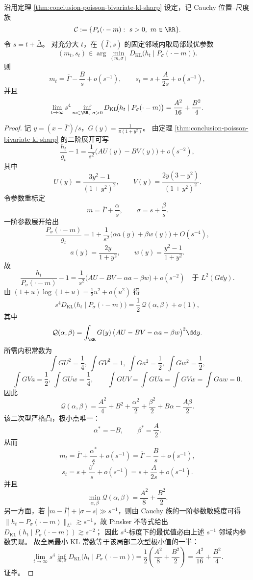 \begin{theorem}\label{thm:conclusion-poisson-bivariate-information-projection-halving}
沿用定理 \ref{thm:conclusion-poisson-bivariate-kl-sharp} 设定，记 Cauchy 位置--尺度族
\[
\mathcal C:=\{P_s(\cdot-m):\ s>0,\ m\in\RR\}.
\]
令 \(s=t+\bar\Delta\)。
对充分大 \(t\)，在 \((\bar\Gamma,s)\) 的固定邻域内取局部最优参数
\[
(m_t,s_t)\in\arg\min_{(m,\sigma)}D_{\mathrm{KL}}\!\bigl(h_t\mid P_\sigma(\cdot-m)\bigr).
\]
则
\[
m_t=\bar\Gamma-\frac{B}{s}+o(s^{-1}),
\qquad
s_t=s+\frac{A}{2s}+o(s^{-1}),
\]
并且
\[
\lim_{t\to\infty}s^4
\inf_{m\in\RR,\ \sigma>0}
D_{\mathrm{KL}}\!\bigl(h_t\mid P_\sigma(\cdot-m)\bigr)
=\frac{A^2}{16}+\frac{B^2}{4}.
\]
\end{theorem}
\begin{proof}
记 \(y=(x-\bar\Gamma)/s\)，\(G(y)=\frac{1}{\pi(1+y^2)}\)。
由定理 \ref{thm:conclusion-poisson-bivariate-kl-sharp} 的二阶展开可写
\[
\frac{h_t}{g_t}-1
=\frac{1}{s^2}\bigl(AU(y)-BV(y)\bigr)+o(s^{-2}),
\]
其中
\[
U(y)=\frac{3y^2-1}{(1+y^2)^2},\qquad
V(y)=\frac{2y(3-y^2)}{(1+y^2)^2}.
\]
令参数重标定
\[
m=\bar\Gamma+\frac{\alpha}{s},\qquad
\sigma=s+\frac{\beta}{s}.
\]
一阶参数展开给出
\[
\frac{P_\sigma(\cdot-m)}{g_t}
=1+\frac{1}{s^2}\bigl(\alpha a(y)+\beta w(y)\bigr)+O(s^{-4}),
\]
\[
a(y)=\frac{2y}{1+y^2},\qquad
w(y)=\frac{y^2-1}{1+y^2}.
\]
故
\[
\frac{h_t}{P_\sigma(\cdot-m)}-1
=\frac{1}{s^2}\bigl(AU-BV-\alpha a-\beta w\bigr)+o(s^{-2})
\quad\text{于 }L^2(G\dd y).
\]
由 \((1+u)\log(1+u)=\frac12u^2+o(u^2)\) 得
\[
s^4D_{\mathrm{KL}}\!\bigl(h_t\mid P_\sigma(\cdot-m)\bigr)
=\frac12\,\mathcal Q(\alpha,\beta)+o(1),
\]
其中
\[
\mathcal Q(\alpha,\beta)
=\int_{\RR}G(y)\,\bigl(AU-BV-\alpha a-\beta w\bigr)^2\dd y.
\]
所需内积常数为
\[
\int GU^2=\frac14,\ \int GV^2=1,\ \int Ga^2=\frac12,\ \int Gw^2=\frac12,
\]
\[
\int GVa=\frac12,\ \int GUw=\frac14,\qquad
\int GUV=\int GUa=\int GVw=\int Gaw=0.
\]
因此
\[
\mathcal Q(\alpha,\beta)
=\frac{A^2}{4}+B^2+\frac{\alpha^2}{2}+\frac{\beta^2}{2}
+B\alpha-\frac{A\beta}{2}.
\]
该二次型严格凸，极小点唯一：
\[
\alpha^\ast=-B,\qquad \beta^\ast=\frac{A}{2}.
\]
从而
\[
m_t=\bar\Gamma+\frac{\alpha^\ast}{s}+o(s^{-1})
=\bar\Gamma-\frac{B}{s}+o(s^{-1}),
\]
\[
s_t=s+\frac{\beta^\ast}{s}+o(s^{-1})
=s+\frac{A}{2s}+o(s^{-1}).
\]
并且
\[
\min_{\alpha,\beta}\mathcal Q(\alpha,\beta)
=\frac{A^2}{8}+\frac{B^2}{2}.
\]
另一方面，若 \(|m-\bar\Gamma|+|\sigma-s|\gg s^{-1}\)，则由 Cauchy 族的一阶参数敏感度可得
\(
\|h_t-P_\sigma(\cdot-m)\|_{L^1}\gtrsim s^{-1}
\)，故 Pinsker 不等式给出
\(
D_{\mathrm{KL}}(h_t\mid P_\sigma(\cdot-m))\gtrsim s^{-2}
\)；
因此 \(s^4\)-标度下的最优值必由上述 \(s^{-1}\) 邻域内参数实现。
故全局最小 KL 常数等于该局部二次型极小值的一半：
\[
\lim_{t\to\infty}s^4\inf_{m,\sigma}D_{\mathrm{KL}}\!\bigl(h_t\mid P_\sigma(\cdot-m)\bigr)
=\frac12\left(\frac{A^2}{8}+\frac{B^2}{2}\right)
=\frac{A^2}{16}+\frac{B^2}{4}.
\]
证毕。
\end{proof}

